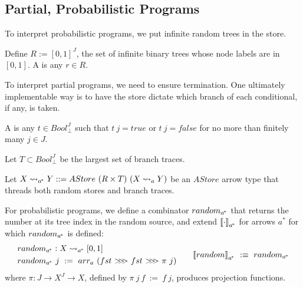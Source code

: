 \documentclass{llncs}
\newcommand{\arrow}{\rightsquigarrow}
\newcommand{\acomp}{\ensuremath{{>}\mspace{-6mu}{>}\mspace{-6mu}{>}}}
\newcommand{\gen}{_a}
\newcommand{\genc}{_{a^{\mspace{-2mu}*}}}
\begin{document}
\subsection{Partial, Probabilistic Programs}
\label{sec:probabilistic-programs}

To interpret probabilistic programs, we put infinite random trees in the store.

\begin{definition}
Define $R := [0,1]^J$, the set of infinite binary trees whose node labels are in $[0,1]$.
A  is any $r \in R$.
\end{definition}

To interpret partial programs, we need to ensure termination.
One ultimately implementable way is to have the store dictate which branch of each conditional, if any, is taken.

\begin{definition}
A  is any $t \in Bool_\bot^J$ such that $t~j = true$ or $t~j = false$ for no more than finitely many $j \in J$.

Let $T \subset Bool_\bot^J$ be the largest set of branch traces.
\end{definition}

Let $X \arrow\genc Y ::= AStore~(R \times T)~(X \arrow\gen Y)$ be an $AStore$ arrow type that threads both random stores and branch traces.

For probabilistic programs, we define a combinator $random\genc$ that returns the number at its tree index in the random source, and extend $\meaningof{\cdot}\genc$ for arrows $a^*$ for which $random\genc$ is defined:
\begin{equation}
\begin{aligned}
	&\begin{aligned}
		&random\genc : X \arrow\genc [0,1] \\
		&random\genc~j \ := \ arr\gen~(fst~\acomp~fst~\acomp~\pi~j)
	\end{aligned}
&\tab
	\meaningof{random}\genc \ :\equiv \ random\genc
\end{aligned}
\end{equation}
where $\pi : J \to X^J \to X$, defined by $\pi~j~f \ := \ f~j$, produces projection functions.
\end{document}
